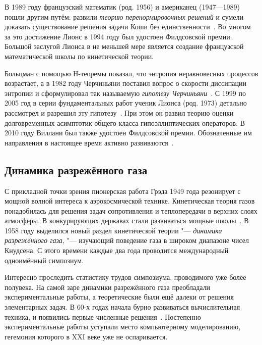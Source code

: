 \documentclass[a4paper, 12pt, oneside]{article} %
\begin{document}
В 1989 году французский математик  (род. 1956) и
американец  (1947---1989) пошли другим путём:
развили \emph{теорию перенормировочных решений} и сумели доказать
существование решения задачи Коши без
единственности~\cite{diperna1989cauchy}. Во многом за это достижение
Лионс в 1994 году был удостоен Филдсовской премии. Большой заслугой
Лионса в не меньшей мере является создание французской математической
школы по кинетической теории.

Больцман с помощью H-теоремы показал, что энтропия неравновесных
процессов возрастает, а в 1982 году Черчиньяни поставил вопрос о
скорости диссипации энтропии и сформулировал так называемую
\emph{гипотезу Черчиньяни}~\cite{cercignani1982conjecture}. С 1999 по
2005 год в серии фундаментальных работ ученик Лионса  (род. 1973) детально рассмотрел и разрешил эту
гипотезу~\cite{yau2010work}. При этом он развил теорию оценки
долговременных асимптотик общего класса гипоэллиптических операторов. В
2010 году Виллани был также удостоен Филдсовской премии. Обозначенные им
направления в настоящее время активно развиваются~\cite{villani2002review}.

\subsection{Динамика разрежённого газа}

С прикладной точки зрения пионерская работа Грэда 1949 года резонирует с
мощной волной интереса к аэрокосмической технике. Кинетическая теория
газов понадобилась для решения задач сопротивления и теплопередачи в
верхних слоях атмосферы. В конкурирующих державах стали развиваться
мощные школы~\cite{grad1958principles, kogan1967dynamics}. В 1958 году
выделился новый раздел кинетической теории "--- \emph{динамика
разрежённого газа}, "--- изучающий поведение газа в широком диапазоне чисел Кнудсена.
С этого времени каждые два года проводится международный
одноимённый симпозиум.

Интересно проследить статистику трудов симпозиума, проводимого уже более
полувека. На самой заре динамики разрежённого газа преобладали
экспериментальные работы, а теоретические были ещё далеки от решения
элементарных задач. В 60-х годах начала бурно развиваться вычислительная
техника, и появились первые численные
решения~\cite{cercignani1978applications}. Постепенно экспериментальные
работы уступали место компьютерному моделированию, гегемония которого в
XXI веке уже не оспаривается.
\end{document}
